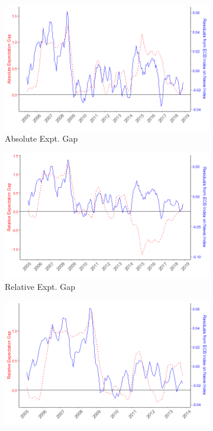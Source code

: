 \documentclass[review]{elsarticle}
\begin{document}
   \begin{figure}[h!]
    \centering
\begin{subfigure}{6cm}
    \includegraphics{abs_exp_res.png}
    \caption{Absolute Expt. Gap}
    \label{10}
\end{subfigure}
\hfil
\begin{subfigure}{6cm}
    \includegraphics{rel_exp_res.png}
    \caption{Relative Expt. Gap}
    \label{100}
\end{subfigure}
\vfil
\begin{subfigure}{6cm}
    \includegraphics{rel_exp_res_prev2014.png}

\end{subfigure}
\end{figure}
\end{document}
